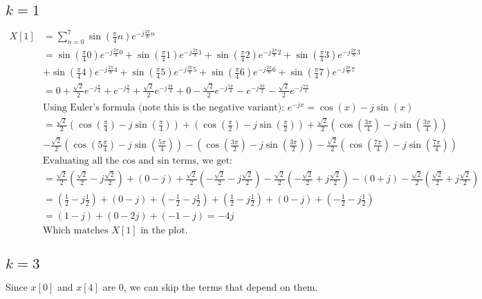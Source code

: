 \documentclass{article}
\begin{document}
\subsection{$k = 1$}
\begin{align*}
    X[1] &= \sum_{n=0}^{7} \sin(\frac{\pi}{4}n) e^{-j\frac{2\pi}{8}n} \\
    &= \sin(\frac{\pi}{4}0) e^{-j\frac{2\pi}{8}0} + \sin(\frac{\pi}{4}1) e^{-j\frac{2\pi}{8}1}
    + \sin(\frac{\pi}{4}2) e^{-j\frac{2\pi}{8}2} + \sin(\frac{\pi}{4}3) e^{-j\frac{2\pi}{8}3} \\
    &+ \sin(\frac{\pi}{4}4) e^{-j\frac{2\pi}{8}4} + \sin(\frac{\pi}{4}5) e^{-j\frac{2\pi}{8}5}
    + \sin(\frac{\pi}{4}6) e^{-j\frac{2\pi}{8}6} + \sin(\frac{\pi}{4}7) e^{-j\frac{2\pi}{8}7} \\
    &= 0 + \frac{\sqrt{2}}{2} e^{-j\frac{\pi}{4}} + e^{-j\frac{\pi}{2}} + \frac{\sqrt{2}}{2} e^{-j\frac{3\pi}{4}}
    + 0 - \frac{\sqrt{2}}{2} e^{-j\frac{5\pi}{4}} - e^{-j\frac{3\pi}{2}} - \frac{\sqrt{2}}{2} e^{-j\frac{7\pi}{4}} \\
    &\textrm{Using Euler's formula (note this is the negative variant): } e^{-jx} = \cos(x) - j\sin(x) \\
    &= \frac{\sqrt{2}}{2} (\cos(\frac{\pi}{4}) - j\sin(\frac{\pi}{4})) + (\cos(\frac{\pi}{2}) - j\sin(\frac{\pi}{2}))
    + \frac{\sqrt{2}}{2} (\cos(\frac{3\pi}{4}) - j\sin(\frac{3\pi}{4})) \\
    &- \frac{\sqrt{2}}{2} (\cos(5\frac{\pi}{4}) - j\sin(\frac{5\pi}{4})) - (\cos(\frac{3\pi}{2}) - j\sin(\frac{3\pi}{2}))
    - \frac{\sqrt{2}}{2} (\cos(\frac{7\pi}{4}) - j\sin(\frac{7\pi}{4})) \\
    &\textrm{Evaluating all the cos and sin terms, we get:} \\
    &= \frac{\sqrt{2}}{2} (\frac{\sqrt{2}}{2}- j\frac{\sqrt{2}}{2}) + (0 - j)
    + \frac{\sqrt{2}}{2} (-\frac{\sqrt{2}}{2} - j\frac{\sqrt{2}}{2})
    - \frac{\sqrt{2}}{2} (-\frac{\sqrt{2}}{2} + j\frac{\sqrt{2}}{2}) - (0 + j)
    - \frac{\sqrt{2}}{2} (\frac{\sqrt{2}}{2} + j\frac{\sqrt{2}}{2}) \\
    &= (\frac{1}{2}- j\frac{1}{2}) + (0 - j) + (-\frac{1}{2} - j\frac{1}{2})
    + (\frac{1}{2} - j\frac{1}{2}) + (0 - j) + (-\frac{1}{2} - j\frac{1}{2}) \\
    &= (1 - j) + (0 - 2j) + (-1 - j) = -4j \\
    &\textrm{Which matches } X[1] \textrm{ in the plot.}
\end{align*}

\subsection{$k = 3$}
Since $x[0]$ and $x[4]$ are $0$, we can skip the terms that depend on them.
\end{document}

